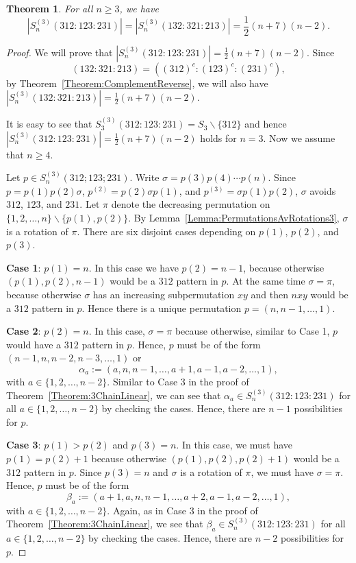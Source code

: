 \documentclass[11pt]{article}
\newtheorem{theorem}{Theorem}[section]
\theoremstyle{definition}
\newcommand{\half}{{\textstyle\frac12}}
\numberwithin{equation}{section}
\begin{document}
\begin{theorem}\label{Theorem:3ChainQuadratic}
    For all $n\geq3$, we have
    \[
    |S_n^{(3)}(312:123:231)|=|S_n^{(3)}(132:321:213)|=\half (n+7)(n-2).
    \]
\end{theorem}
\begin{proof}
    We will prove that $|S_n^{(3)}(312:123:231)|=\half (n+7)(n-2)$. Since \[(132:321:213)=((312)^c:(123)^c:(231)^c),\] by 
Theorem~\ref{Theorem:ComplementReverse}, we will also have $|S_n^{(3)}(132:321:213)|=\half (n+7)(n-2)$. 
    
    It is easy to see that $S_3^{(3)}(312:123:231)=S_3\backslash\{312\}$ and hence $|S_n^{(3)}(312:123:231)|=\half (n+7)(n-2)$ holds for $n=3$. Now we assume that $n\geq4$.

    Let $p\in S_n^{(3)}(312;123;231)$. Write $\sigma=p(3)p(4)\cdots p(n)$. Since $p=p(1)p(2)\sigma$, $p^{(2)}=p(2)\sigma p(1)$, and $p^{(3)}=\sigma p(1)p(2)$, $\sigma$ avoids $312$, $123$, and $231$. Let $\pi$ denote the decreasing permutation on $\{1,2,\ldots,n\}\backslash\{p(1),p(2)\}$. By Lemma~\ref{Lemma:PermutationsAvRotations3}, $\sigma$ is a rotation of $\pi$.  There are six 
disjoint cases depending on $p(1)$, $p(2)$, and $p(3)$.

    {\bf Case 1}: $p(1)=n$. In this case we have $p(2)=n-1$, because otherwise $(p(1),p(2),n-1)$ would be a $312$ pattern in $p$. 
At the same time $\sigma=\pi$, because otherwise $\sigma$ has an increasing subpermutation $xy$ and then $nxy$ would be a $312$ pattern in $p$. Hence there is a unique permutation $p=(n,n-1,\ldots,1)$.

    {\bf Case 2}: $p(2)=n$. In this case, $\sigma=\pi$ because otherwise, similar to Case 1, $p$ would have a $312$ pattern in $p$. Hence, $p$ must be of the form $(n-1,n,n-2,n-3,\ldots,1)$ or \[\alpha_a:=(a,n,n-1,\ldots,a+1,a-1,a-2,\ldots,1),\] with $a\in\{1,2,\ldots,n-2\}$. Similar to Case 3 in the proof of Theorem~\ref{Theorem:3ChainLinear}, we can see that $\alpha_a\in S_n^{(3)}(312:123:231)$ for all $a\in\{1,2,\ldots,n-2\}$ by checking the cases. Hence, there are $n-1$ possibilities for $p$.

    {\bf Case 3}: $p(1)>p(2)$ and $p(3)=n$. In this case, we must have $p(1)=p(2)+1$ because otherwise $(p(1),p(2),p(2)+1)$ would be a $312$ pattern in $p$. Since $p(3)=n$ and $\sigma$ is a rotation of $\pi$, we must have $\sigma=\pi$. Hence, $p$ must be of the form
    \[
    \beta_a:=(a+1,a,n,n-1,\ldots,a+2,a-1,a-2,\ldots,1),
    \]
    with $a\in\{1,2,\ldots,n-2\}$. Again, as in Case 3 in the proof of Theorem~\ref{Theorem:3ChainLinear}, we see that $\beta_a\in S_n^{(3)}(312:123:231)$ for all $a\in\{1,2,\ldots,n-2\}$ by checking the cases. 
Hence, there are $n-2$ possibilities for $p$.


\end{proof}
\end{document}
